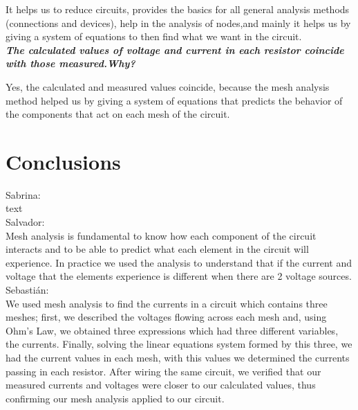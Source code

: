 \documentclass[letterpaper]{article}
\begin{document}
It helps us to reduce circuits, provides the basics for all general analysis methods (connections and devices), 
help in the analysis of nodes,and mainly it helps us by giving a system of equations to then find what we 
want in the circuit.\\
\textit{\textbf{The calculated values of voltage and current in each resistor coincide with those measured.Why?}}

Yes, the calculated and measured values coincide, because the mesh analysis method helped us by giving a system of equations that predicts the behavior of the components that act on each mesh of the circuit.
\section{Conclusions}
{\large Sabrina:}\\
text%
\\[2ex]
{\large Salvador:}\\
Mesh analysis is fundamental to know how each component of the circuit interacts and to be able to predict 
what each element in the circuit will experience. In practice we used the analysis to understand that if 
the current and voltage that the elements experience is different when there are 2 voltage sources.
\\[2ex]
{\large Sebastián:}\\
We used mesh analysis to find the currents in a circuit which contains three meshes; first, we
described the voltages flowing across each mesh and, using Ohm's Law, we obtained three expressions
which had three different variables, the currents. Finally, solving the linear equations system
formed by this three, we had the current values in each mesh, with this values we determined the
currents passing in each resistor. After wiring the same circuit, we verified that our measured
currents and voltages were closer to our calculated values, thus confirming our mesh analysis
applied to our circuit.
\end{document}

